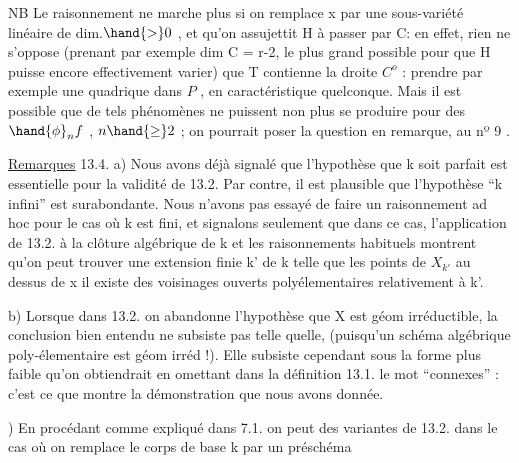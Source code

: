 
NB \quad Le raisonnement ne marche plus si on remplace x par une
sous-variété linéaire  de dim.$\hand{>}0$ , et qu'on assujettit H à passer
par C: en effet, rien ne s'oppose (prenant par exemple dim C = r-2, le
plus grand possible pour que H puisse encore effectivement varier) que
T contienne la droite $C^{o}$ :
 prendre par
exemple une quadrique  dans $P$ , en caractéristique quelconque. Mais il
est possible que de tels phénomènes ne puissent non plus se produire 
pour des $\hand{\phi}_n f$ , $n\hand{\geq} 2$ ; on pourrait poser la question en remarque, au
nº 9 .

\uline{Remarques} 13.4. \quad a) Nous avons déjà signalé que l'hypothèse que k 
soit parfait est essentielle pour la validité de 13.2. Par contre, il
est plausible que l'hypothèse ``k infini'' est surabondante. 
Nous n'avons pas essayé  de faire un raisonnement ad hoc pour le cas
où k est fini, et signalons seulement que dans ce cas, l'application de
13.2. à la clôture algébrique de k et les raisonnements habituels
montrent qu'on peut trouver une extension finie k' de k telle que
  les points de $X_{k'}$ au dessus de x il existe des voisinages ouverts
polyélementaires relativement à k'.

b) Lorsque dans 13.2. on abandonne l'hypothèse que X est géom
irréductible, la conclusion bien entendu ne subsiste pas telle quelle,
(puisqu'un schéma algébrique poly-élementaire est géom irréd !). Elle
subsiste cependant sous la forme plus faible qu'on obtiendrait en
omettant dans la définition 13.1. le mot ``connexes'' : c'est ce que
montre la démonstration que nous avons donnée.

) En procédant comme expliqué dans 7.1. on peut  des variantes
de 13.2. dans le cas où on remplace le corps de base k par un préschéma
